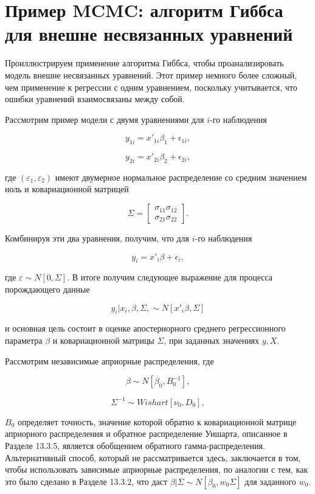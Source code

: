 \section{Пример MCMC: алгоритм Гиббса для внешне несвязанных уравнений}

Проиллюстрируем применение алгоритма Гиббса, чтобы проанализировать модель внешне несвязанных уравнений. Этот пример  немного более сложный, чем применение к регрессии с одним уравнением, поскольку учитывается, что ошибки уравнений взаимосвязаны между собой.

Рассмотрим пример модели с двумя уравнениями для $i$-го наблюдения

\[
y_{1i}=x'_{1i}\beta_1+\epsilon_{1i},
\]

\[
y_{2i}=x'_{2i}\beta_2+\epsilon_{2i},
\]

где $(\varepsilon_1,\varepsilon_2)$ имеют двумерное нормальное распределение со средним значением ноль и ковариационной матрицей 

\[
\Sigma=
\begin{bmatrix} \sigma_{11} \sigma_{12}\\ \sigma_{21} \sigma_{22} \end{bmatrix}.
\]

Комбинируя эти два уравнения, получим, что для $i$-го наблюдения 

\[
y_{i}=x'_{i}\beta+\epsilon_{i},
\]

где $\varepsilon{\sim}N[0,\Sigma]$. В итоге получим следующее выражение для процесса порождающего данные

\[
y_{i}|x_{i},\beta,\Sigma,\sim N[x'_{i}\beta,\Sigma]
\]

и основная цель состоит в  оценке апостериорного среднего регрессионного параметра $\beta$ и ковариационной матрицы $\Sigma$, при заданных значениях $y,X$.

Рассмотрим независимые априорные распределения, где

\[
\beta \sim N[\beta_{0},B^{-1}_0],
\]

\[
\Sigma^{-1} \sim Wishart[\nu_{0},D_0],
\]

$B_0$ определяет точность, значение которой обратно к ковариационной матрице априорного распределения и обратное распределение Уишарта, описанное в Разделе 13.3.5, является обобщением обратного гамма-распределения. Альтернативный способ, который не рассматривается здесь, заключается в том, чтобы использовать зависимые априорные распределения, по аналогии с тем, как это было сделано в Разделе 13.3.2, что даст $\beta|\Sigma  \sim N[\beta_0,w_{0}\Sigma]$ для заданного $w_0$.

